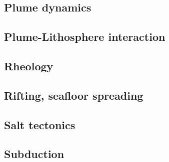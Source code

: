\cite{zieg92a}
\cite{zhgm98}
\cite{lizh09}
\cite{huss12}
\cite{yoha15}

\subsection*{Plume dynamics}

\cite{nasf94}\cite{hayu94}
\cite{lays99}
\cite{isst06}
\cite{dagm13}
\cite{daso15}
\cite{dacc18}

\subsection*{Plume-Lithosphere interaction}


\subsection*{Rheology}

\cite{druc51}
\cite{hafn51}
\cite{drpr52}
\cite{hand69}
\cite{delo81}
\cite{lova01}
\cite{hirt02}
\cite{hiko03}
\cite{didr05}\cite{drur05}
\cite{hirw07}
\cite{lemm08}
\cite{lell11}
\cite{lepo13}


\subsection*{Rifting, seafloor spreading}

\cite{hoen86b}
\cite{zieg92b}
\cite{dusa96}
\cite{hupc01}
\cite{hube02}\cite{hani02}\cite{dabm02}
\cite{hube03}\cite{hani03}
\cite{hier04}
\cite{hubb05}
\cite{huha07}
\cite{agcz09}
\cite{aubh10}
\cite{alht11}
\cite{alht12}\cite{alhf12}
\cite{hebr14}\cite{lige14}
\cite{nabu15}
\cite{olbm16}\cite{jekm16}
\cite{lemh17}

\subsection*{Salt tectonics}

\cite{zaju92}
\cite{nabr93}
\cite{istt04}
\cite{huja07}

\subsection*{Subduction}

